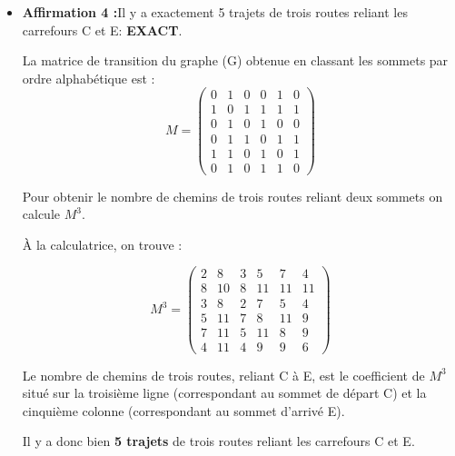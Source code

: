 \begin{corrige}
\begin{itemize}
          Ces trajets ont nécessairement comme extrémités B et F ; par exemple : B-C-D-E-A-B-E-F-D-B-F.
          \item %
          \textbf{Affirmation 4 :}\quad Il y a exactement 5 trajets de trois routes reliant les carrefours C et E: \textbf{EXACT}.
          \par
          La matrice de transition du graphe (G) obtenue en classant les sommets par ordre alphabétique est :
          \[ M = \begin{pmatrix}
               0 &1 &0 &0 &1 &0 \\
               1 &0 &1 &1 &1 &1 \\
               0 &1 &0 &1 &0 &0 \\
               0 &1 &1 &0 &1 &1 \\
               1 &1 &0 &1 &0 &1\\
          0 &1 &0 &1 &1 &0  \end{pmatrix}
          \]
          \par
          Pour obtenir le nombre de chemins de trois routes reliant deux sommets on calcule $M^3$.
          \par
          \`A la calculatrice, on trouve :
          \par
          \[ M^3 = \begin{pmatrix}
               2 &8 &3 &5 &7 &4 \\
               8 &10 &8 &11 &11 &11 \\
               3 &8 &2 &7 &5 &4 \\
               5 &11 &7 &8 &11 &9 \\
               7 &11 &5 &11 &8 &9\\
          4 &11 &4 &9 &9 &6  \end{pmatrix}
          \]
          \par
          Le nombre de chemins de trois routes, reliant C à E, est le coefficient de $M^3$ situé sur la troisième ligne (correspondant au sommet de départ C) et la cinquième colonne (correspondant au sommet d'arrivé E).
          \par
          Il y a donc bien \textbf{5 trajets} de trois routes reliant les carrefours C et E.
          \par
\end{itemize}
\end{corrige}
